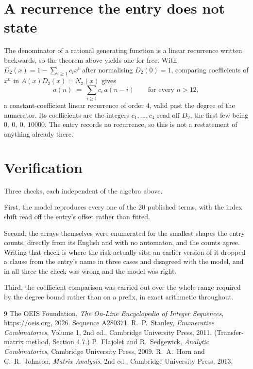 \documentclass[11pt,a4paper]{article}
\theoremstyle{plain}
\theoremstyle{definition}
\begin{document}
\section{A recurrence the entry does not state}

The denominator of a rational generating function is a linear recurrence written backwards, so
the theorem above yields one for free. With $D_2(x)=1-\sum_{i\ge1}c_ix^i$ after normalising
$D_2(0)=1$, comparing coefficients of $x^n$ in $A(x)D_2(x)=N_2(x)$ gives
\[
a(n)\;=\;\sum_{i\ge1}c_i\,a(n-i)\qquad\text{for every }n>12,
\]
a constant-coefficient linear recurrence of order $4$, valid past the degree of the
numerator. Its coefficients are the integers $c_1,\dots,c_{4}$ read off $D_2$, the first few being $0,\ 0,\ 0,\ 10000$. The entry records no recurrence, so this is not a restatement of anything
already there.

\section{Verification}

Three checks, each independent of the algebra above.

First, the model reproduces every one of the $20$ published terms, with the index shift
read off the entry's offset rather than fitted.

Second, the arrays themselves were enumerated for the smallest shapes the entry counts,
directly from its English and with no automaton, and the counts agree. Writing that check is
where the risk actually sits: an earlier version of it dropped a clause from the entry's name
in three cases and disagreed with the model, and in all three the check was wrong and the model
was right.

Third, the coefficient comparison was carried out over the whole range required by the degree
bound rather than on a prefix, in exact arithmetic throughout.

\begin{thebibliography}{9}
 The OEIS Foundation, \emph{The On-Line Encyclopedia of Integer
Sequences}, \url{https://oeis.org}, 2026. Sequence A280371.
 R.~P.~Stanley, \emph{Enumerative Combinatorics}, Volume 1, 2nd ed.,
Cambridge University Press, 2011. (Transfer-matrix method, Section 4.7.)
 P.~Flajolet and R.~Sedgewick, \emph{Analytic Combinatorics}, Cambridge
University Press, 2009.
 R.~A.~Horn and C.~R.~Johnson, \emph{Matrix Analysis}, 2nd ed., Cambridge
University Press, 2013.
\end{thebibliography}
\end{document}
